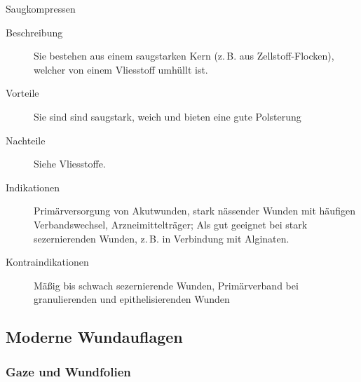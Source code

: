 \Text
{Saugkompressen}
{ 
\begin{description}
  \item[Beschreibung] Sie bestehen aus einem saugstarken
  Kern (z.\,B. aus Zellstoff-Flocken), welcher von einem
  Vliesstoff umhüllt ist.
  \item[Vorteile] Sie sind sind saugstark, weich und bieten eine gute Polsterung
  \item[Nachteile] Siehe Vliesstoffe. 
  \item[Indikationen] Primärversorgung von Akutwunden, stark
  nässender Wunden mit häufigen Verbandswechsel,
  Arzneimittelträger; Als  gut geeignet
  bei stark sezernierenden Wunden, z.\,B. in Verbindung mit
  Alginaten.
  \item[Kontraindikationen] Mäßig bis schwach
  sezernierende Wunden, Primärverband bei granulierenden und epithelisierenden Wunden 
\end{description}
}
{}
{}
{}
{}


\subsection{Moderne Wundauflagen}

\subsubsection{Gaze und Wundfolien}


